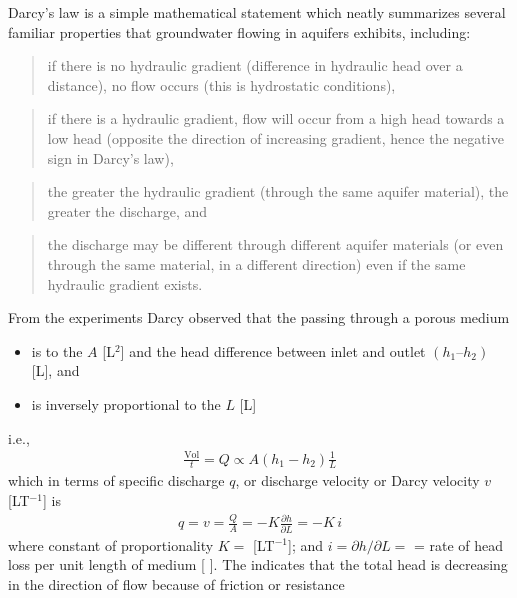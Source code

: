 \documentclass[letterpaper,10pt,english]{jupyterBook}
\begin{document}
\sphinxAtStartPar
Darcy’s law is a simple mathematical statement which neatly summarizes several
familiar properties that groundwater flowing in aquifers exhibits, including:
\begin{quote}

\sphinxAtStartPar
if there
is no hydraulic gradient (difference in hydraulic head over a distance), no flow occurs
(this is hydrostatic conditions),
\end{quote}
\begin{quote}

\sphinxAtStartPar
if there is a hydraulic gradient, flow will occur from
a high head towards a low head (opposite the direction of increasing gradient, hence the
negative sign in Darcy’s law),
\end{quote}
\begin{quote}

\sphinxAtStartPar
the greater the hydraulic gradient (through the same
aquifer material), the greater the discharge, and
\end{quote}
\begin{quote}

\sphinxAtStartPar
the discharge may be different
through different aquifer materials (or even through the same material, in a different
direction) even if the same hydraulic gradient exists.
\end{quote}

\sphinxAtStartPar
From the experiments Darcy observed that the  passing through a porous medium
\begin{itemize}
\item {} 
\sphinxAtStartPar
is  to the  \(A\) {[}L\(^2\){]} and the head difference between inlet and outlet \((h_1 – h_2)\) {[}L{]}, and

\item {} 
\sphinxAtStartPar
is inversely proportional to the  \(L\) {[}L{]}

\end{itemize}

\sphinxAtStartPar
i.e.,
\begin{equation*}
\begin{split}
\frac{\text{Vol}}{t}= Q \propto A (h_1 - h_2)\frac{1}{L}
\end{split}
\end{equation*}
\sphinxAtStartPar
which in terms of specific discharge \(q\), or discharge velocity or Darcy velocity \(v\) {[}LT\(^{-1}\){]} is
\begin{equation*}
\begin{split}
q = v = \frac{Q}{A}= - K\frac{\partial h}{\partial L} = - K\,i
\end{split}
\end{equation*}
\sphinxAtStartPar
where constant of proportionality \(K =\)  {[}LT\(^{-1}\){]}; and \(i = \partial h/ \partial L =\)
 = rate of head loss per unit length of medium {[} {]}. The 
indicates that the total head is decreasing in the direction of flow because of friction or
resistance
\end{document}
